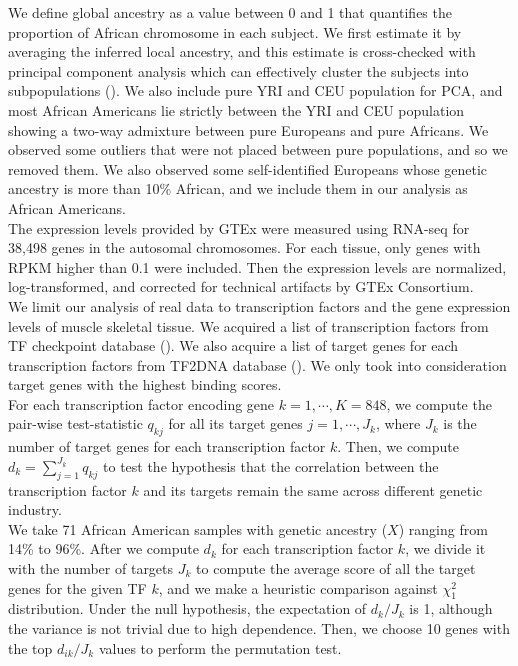 \documentclass[aap,authoryear, preprint]{imsart}
\numberwithin{equation}{section}
\theoremstyle{plain}
\begin{document}
We define global ancestry as a value between 0 and 1 that quantifies the proportion of African chromosome in each subject. We first estimate it by averaging the inferred local ancestry, and this estimate is cross-checked with principal component analysis which can effectively cluster the subjects into subpopulations (\cite{pritchard2000inference}). We also include pure YRI and CEU population for PCA, and most African Americans lie strictly between the YRI and CEU population showing a two-way admixture between pure Europeans and pure Africans. We observed some outliers that were not placed between pure populations, and so we removed them. We also observed some self-identified Europeans whose genetic ancestry is more than 10\% African, and we include them in our analysis as African Americans. \\

The expression levels provided by GTEx were measured using RNA-seq for 38,498 genes in the autosomal chromosomes. For each tissue, only genes with RPKM higher than 0.1 were included. Then the expression levels are normalized, log-transformed, and corrected for technical artifacts by GTEx Consortium. \\

We limit our analysis of real data to transcription factors and the gene expression levels of muscle skeletal tissue. We acquired a list of transcription factors from TF checkpoint database (\cite{chawla2013tfcheckpoint}). We also acquire a list of target genes for each transcription factors from TF2DNA database (\cite{pujato2014prediction}). We only took into consideration target genes with the highest binding scores. \\

For each transcription factor encoding gene $k = 1, \cdots, K = 848$, we compute the pair-wise test-statistic $q_{kj}$ for all its target genes $j = 1, \cdots, J_k$, where $J_k$ is the number of target genes for each transcription factor $k$. Then, we compute $d_k = \sum_{j=1}^{J_k} q_{kj}$ to test the hypothesis that the correlation between the transcription factor $k$ and its targets remain the same across different genetic industry. \\

We take 71 African American samples with genetic ancestry ($X$) ranging from 14\% to 96\%. After we compute $d_{k}$ for each transcription factor $k$, we divide it with the number of targets $J_k$ to compute the average score of all the target genes for the given TF $k$, and we make a heuristic comparison against $\chi_1^2$ distribution. Under the null hypothesis, the expectation of $d_k/J_k$ is 1, although the variance is not trivial due to high dependence. Then, we choose 10 genes with the top $d_{ik}/J_k$ values to perform the permutation test. \\
\end{document}
